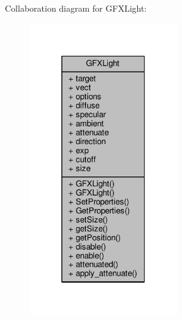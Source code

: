 Collaboration diagram for G\+F\+X\+Light\+:
\nopagebreak
\begin{figure}[H]
\begin{center}
\leavevmode
\includegraphics[width=181pt]{d5/df1/classGFXLight__coll__graph}
\end{center}
\end{figure}
